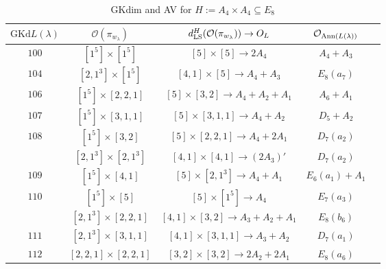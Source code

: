 \documentclass[reqno,12pt]{amsart}
\numberwithin{equation}{section}
\theoremstyle{plain}
\theoremstyle{definition}
\newcommand{\lam}{\lambda}
\renewcommand{\subset}{\subseteq}
\begin{document}
\begin{table}[htbp]\caption{ GKdim and AV for $H:=A_4\times A_4\subset E_8$}
	\label{taba4a4}
	\centering
	\renewcommand{\arraystretch}{1.5}
	\setlength\tabcolsep{5pt}
	
	\begin{tabular}{|c|c|c|c|c|}
		\hline $\mathrm{GKd} L(\lambda)$ &    $\mathcal{O}({\pi_{w_{\lam}}})$& $d_{\rm LS}^{H}(\mathcal{O}(\pi_{w_\lambda}))\rightarrow   O_{L}$ & $\mathcal{O}_{{\rm Ann}(L(\lambda))}$ \\ \hline
		 $ 100 $    &  $ [1^5]\times [1^5]$  &  $ [5]\times [5] \rightarrow 2A_4$     &   $ A_4+A_3$      \\ \hline
		$ 104$   
  &  $ [2,1^3]\times [1^5]$  &$[4,1]\times [5]\rightarrow      A_4+A_3 $  &   $E_8(a_7) $        \\  \hline

$ 106$    &  $ [1^5]\times [2,2,1] $  & $[5]\times [3,2]\rightarrow      A_4+A_2+A_1 $  &   $A_6+A_1 $        \\
\hline

$ 107$    &  $ [1^5]\times [3,1,1] $  & $[5]\times [3,1,1]\rightarrow      A_4+A_2 $  &   $D_5+A_2 $        \\
\hline
$ 108$    &  $ [1^5]\times [3,2] $  & $[5]\times [2,2,1]\rightarrow      A_4+2A_1 $  &   $D_7(a_2) $        \\
&  $ [2,1^3]\times [2,1^3] $  & $[4,1]\times [4,1]\rightarrow      (2A_3)' $&   $D_7(a_2) $        \\
\hline
$ 109$    &  $ [1^5]\times [4,1] $  & $[5]\times [2,1^3]\rightarrow      A_4+A_1 $  &   $E_6(a_1)+A_1 $        \\
\hline

$ 110$    &  $ [1^5]\times [5] $  & $[5]\times [1^5]\rightarrow      A_4 $  &   $E_7(a_3)$        \\
&  $ [2,1^3]\times [2,2,1] $  & $[4,1]\times [3,2]\rightarrow      A_3+A_2+A_1 $  &   $E_8(b_6)$        \\
\hline

$ 111$    &  $ [2,1^3]\times [3,1,1] $  & $[4,1]\times [3,1,1]\rightarrow      A_3+A_2 $  &   $D_7(a_1) $        \\
\hline

$ 112$    &  $ [2,2,1]\times [2,2,1] $  & $[3,2]\times [3,2]\rightarrow      2A_2+2A_1 $  &   $E_8(a_6)$        \\


\end{tabular}
\end{table}
\end{document}
